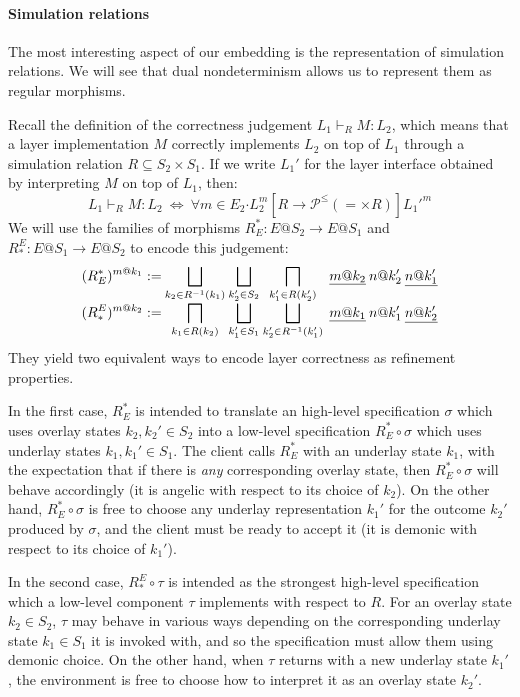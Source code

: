 \documentclass[sigplan,screen]{acmart}
\newcommand{\bdot}{\boldsymbol{\cdot}}
\begin{document}
\paragraph{Simulation relations}

The most interesting aspect of our embedding
is the representation of simulation relations.
We will see that dual nondeterminism
allows us to represent them as regular morphisms.

Recall the definition of
the correctness judgement $L_1 \vdash_R M : L_2$,
which means that a layer implementation $M$
correctly implements $L_2$ on top of $L_1$
through a simulation relation $R \subseteq S_2 \times S_1$.
If we write $L_1'$ for the layer interface obtained
by interpreting $M$ on top of $L_1$,
then:
\[
  L_1 \vdash_R M : L_2 \:\Leftrightarrow\:
  \forall m \in E_2 \bdot
    L_2^m
    \mathrel{[R \rightarrow \mathcal{P}^\le({=} \times R)]}
    {L_1'}^m
\]
We will use the families of morphisms
$R^*_E : E@S_2 \rightarrow E@S_1$ and
$R_*^E : E@S_1 \rightarrow E@S_2$
to encode this judgement:
\[
  {\everymath={\displaystyle}
  \begin{array}{r@{\:}c@{\:}c@{\:}c@{\:}l}
  (R^*_E)^{m@k_1} := &
    \bigsqcup_{k_2 \in R^{-1}(k_1)} &
    \bigsqcup_{k_2' \in S_2} &
    \bigsqcap_{k_1' \in R(k_2')} &
    \: \underline{m@k_2} \: n@k_2' \: \underline{n@k_1'} \\
  (R_*^E)^{m@k_2} := &
    \bigsqcap_{k_1 \in R(k_2)} &
    \bigsqcup_{k_1' \in S_1} &
    \bigsqcup_{k_2' \in R^{-1}(k_1')} &
    \: \underline{m@k_1} \: n@k_1' \: \underline{n@k_2'}
  \end{array}}
\]
They yield two equivalent ways to encode
layer correctness as refinement properties.

In the first case,
$R^*_E$ is intended to translate
an high-level specification $\sigma$
which uses overlay states $k_2, k_2' \in S_2$
into a low-level specification $R^*_E \circ \sigma$
which uses underlay states
$k_1, k_1' \in S_1$.
The client calls $R^*_E$
with an underlay state $k_1$,
with the expectation that if there is \emph{any}
corresponding overlay state,
then $R^*_E \circ \sigma$ will behave accordingly
(it is angelic with respect to its choice of $k_2$).
On the other hand,
$R^*_E \circ \sigma$ is free to choose any underlay representation
$k_1'$
for the outcome $k_2'$ produced by $\sigma$,
and the client must be ready to accept it
(it is demonic with respect to its choice of $k_1'$).

In the second case,
$R_*^E \circ \tau$ is intended as
the strongest high-level specification
which a low-level component $\tau$ implements
with respect to $R$.
For an overlay state $k_2 \in S_2$,
$\tau$ may behave in various ways
depending on the corresponding underlay state $k_1 \in S_1$
it is invoked with,
and so the specification must allow them using demonic choice.
On the other hand,
when $\tau$ returns with a new underlay state $k_1'$,
the environment is free to choose
how to interpret it as an overlay state $k_2'$.
\end{document}
